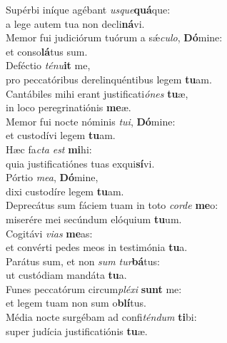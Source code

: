 \oddverse Supérbi iníque agébant \textit{us}\textit{que}\textbf{quá}que:~\*\\
\oddverse a lege autem tua non decli\textbf{ná}vi.\\
\evenverse Memor fui judiciórum tuórum a sǽ\textit{cu}\textit{lo}, \textbf{Dó}mine:~\*\\
\evenverse et conso\textbf{lá}tus sum.\\
\oddverse Deféctio \textit{té}\textit{nu}\textbf{it} me,~\*\\
\oddverse pro peccatóribus derelinquéntibus legem \textbf{tu}am.\\
\evenverse Cantábiles mihi erant justificati\textit{ó}\textit{nes} \textbf{tu}æ,~\*\\
\evenverse in loco peregrinatiónis \textbf{me}æ.\\
\oddverse Memor fui nocte nóminis \textit{tu}\textit{i}, \textbf{Dó}mine:~\*\\
\oddverse et custodívi legem \textbf{tu}am.\\
\evenverse Hæc fa\textit{cta} \textit{est} \textbf{mi}hi:~\*\\
\evenverse quia justificatiónes tuas exqui\textbf{sí}vi.\\
\oddverse Pórtio \textit{me}\textit{a}, \textbf{Dó}mine,~\*\\
\oddverse dixi custodíre legem \textbf{tu}am.\\
\evenverse Deprecátus sum fáciem tuam in toto \textit{cor}\textit{de} \textbf{me}o:~\*\\
\evenverse miserére mei secúndum elóquium \textbf{tu}um.\\
\oddverse Cogitávi \textit{vi}\textit{as} \textbf{me}as:~\*\\
\oddverse et convérti pedes meos in testimónia \textbf{tu}a.\\
\evenverse Parátus sum, et non \textit{sum} \textit{tur}\textbf{bá}tus:~\*\\
\evenverse ut custódiam mandáta \textbf{tu}a.\\
\oddverse Funes peccatórum circum\textit{plé}\textit{xi} \textbf{sunt} me:~\*\\
\oddverse et legem tuam non sum o\textbf{blí}tus.\\
\evenverse Média nocte surgébam ad confi\textit{tén}\textit{dum} \textbf{ti}bi:~\*\\
\evenverse super judícia justificatiónis \textbf{tu}æ.\\
